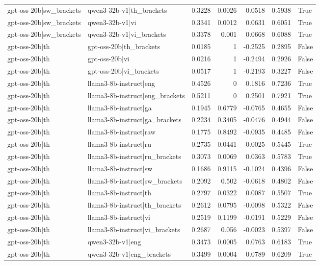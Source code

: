 \begin{table}
\begin{tabular}{l l r r r r l}
gpt-oss-20b|sw_brackets & qwen3-32b-v1|th_brackets & 0.3228 & 0.0026 & 0.0518 & 0.5938 & True \\
gpt-oss-20b|sw_brackets & qwen3-32b-v1|vi & 0.3341 & 0.0012 & 0.0631 & 0.6051 & True \\
gpt-oss-20b|sw_brackets & qwen3-32b-v1|vi_brackets & 0.3378 & 0.001 & 0.0668 & 0.6088 & True \\
gpt-oss-20b|th & gpt-oss-20b|th_brackets & 0.0185 & 1 & -0.2525 & 0.2895 & False \\
gpt-oss-20b|th & gpt-oss-20b|vi & 0.0216 & 1 & -0.2494 & 0.2926 & False \\
gpt-oss-20b|th & gpt-oss-20b|vi_brackets & 0.0517 & 1 & -0.2193 & 0.3227 & False \\
gpt-oss-20b|th & llama3-8b-instruct|eng & 0.4526 & 0 & 0.1816 & 0.7236 & True \\
gpt-oss-20b|th & llama3-8b-instruct|eng_brackets & 0.5211 & 0 & 0.2501 & 0.7921 & True \\
gpt-oss-20b|th & llama3-8b-instruct|ga & 0.1945 & 0.6779 & -0.0765 & 0.4655 & False \\
gpt-oss-20b|th & llama3-8b-instruct|ga_brackets & 0.2234 & 0.3405 & -0.0476 & 0.4944 & False \\
gpt-oss-20b|th & llama3-8b-instruct|raw & 0.1775 & 0.8492 & -0.0935 & 0.4485 & False \\
gpt-oss-20b|th & llama3-8b-instruct|ru & 0.2735 & 0.0441 & 0.0025 & 0.5445 & True \\
gpt-oss-20b|th & llama3-8b-instruct|ru_brackets & 0.3073 & 0.0069 & 0.0363 & 0.5783 & True \\
gpt-oss-20b|th & llama3-8b-instruct|sw & 0.1686 & 0.9115 & -0.1024 & 0.4396 & False \\
gpt-oss-20b|th & llama3-8b-instruct|sw_brackets & 0.2092 & 0.502 & -0.0618 & 0.4802 & False \\
gpt-oss-20b|th & llama3-8b-instruct|th & 0.2797 & 0.0322 & 0.0087 & 0.5507 & True \\
gpt-oss-20b|th & llama3-8b-instruct|th_brackets & 0.2612 & 0.0795 & -0.0098 & 0.5322 & False \\
gpt-oss-20b|th & llama3-8b-instruct|vi & 0.2519 & 0.1199 & -0.0191 & 0.5229 & False \\
gpt-oss-20b|th & llama3-8b-instruct|vi_brackets & 0.2687 & 0.056 & -0.0023 & 0.5397 & False \\
gpt-oss-20b|th & qwen3-32b-v1|eng & 0.3473 & 0.0005 & 0.0763 & 0.6183 & True \\
gpt-oss-20b|th & qwen3-32b-v1|eng_brackets & 0.3499 & 0.0004 & 0.0789 & 0.6209 & True \\

\end{tabular}
\end{table}
